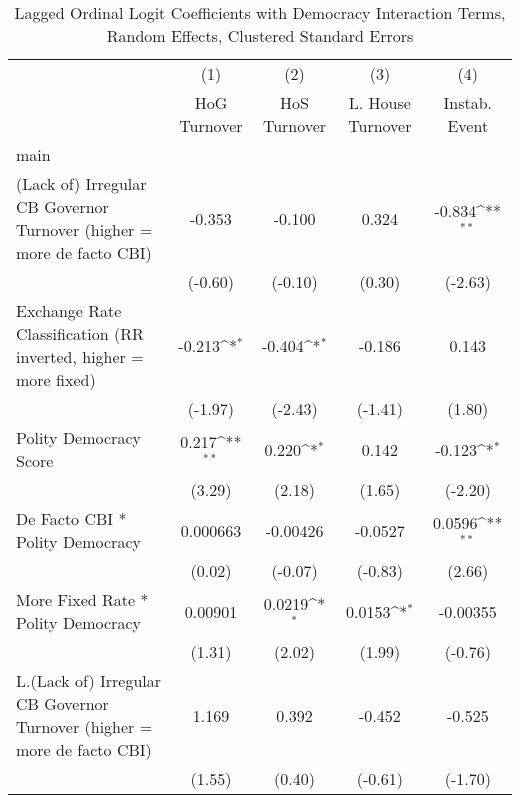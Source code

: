 {
\def\sym#1{\ifmmode^{#1}\else\(^{#1}\)\fi}
\begin{longtable}{l*{4}{c}}
\caption{Lagged Ordinal Logit Coefficients with Democracy Interaction Terms, Random Effects, Clustered Standard Errors \label{demintlagordLogLogDF}}\\
\hline\hline\endfirsthead\hline\endhead\hline\endfoot\endlastfoot
                &\multicolumn{1}{c}{(1)}&\multicolumn{1}{c}{(2)}&\multicolumn{1}{c}{(3)}&\multicolumn{1}{c}{(4)}\\
                &\multicolumn{1}{c}{HoG Turnover}&\multicolumn{1}{c}{HoS Turnover}&\multicolumn{1}{c}{L. House Turnover}&\multicolumn{1}{c}{Instab. Event}\\
\hline
main            &                  &                  &                  &                  \\
(Lack of) Irregular CB Governor Turnover (higher = more de facto CBI)&   -0.353         &   -0.100         &    0.324         &   -0.834\sym{**} \\
                &  (-0.60)         &  (-0.10)         &   (0.30)         &  (-2.63)         \\
[1em]
Exchange Rate Classification (RR inverted, higher = more fixed)&   -0.213\sym{*}  &   -0.404\sym{*}  &   -0.186         &    0.143         \\
                &  (-1.97)         &  (-2.43)         &  (-1.41)         &   (1.80)         \\
[1em]
Polity Democracy Score&    0.217\sym{**} &    0.220\sym{*}  &    0.142         &   -0.123\sym{*}  \\
                &   (3.29)         &   (2.18)         &   (1.65)         &  (-2.20)         \\
[1em]
De Facto CBI * Polity Democracy& 0.000663         & -0.00426         &  -0.0527         &   0.0596\sym{**} \\
                &   (0.02)         &  (-0.07)         &  (-0.83)         &   (2.66)         \\
[1em]
More Fixed Rate * Polity Democracy&  0.00901         &   0.0219\sym{*}  &   0.0153\sym{*}  & -0.00355         \\
                &   (1.31)         &   (2.02)         &   (1.99)         &  (-0.76)         \\
[1em]
L.(Lack of) Irregular CB Governor Turnover (higher = more de facto CBI)&    1.169         &    0.392         &   -0.452         &   -0.525         \\
                &   (1.55)         &   (0.40)         &  (-0.61)         &  (-1.70)         \\

\end{longtable}}
